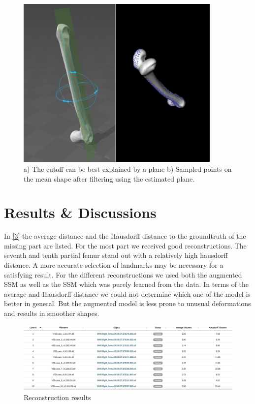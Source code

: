 \documentclass{article}
\begin{document}
	\begin{figure}
	\centering
	\includegraphics[width=10cm]{4.png}
	 \caption{ a) The cutoff can be best explained by a plane b) Sampled points on the mean shape after filtering using the estimated plane.}
	 \label{2}
	\end{figure}
	
	



	
	\section{Results \& Discussions}
	
	In \autoref{3} the average distance and the Hausdorff distance to the groundtruth of the missing part are listed. For the most part we received good reconstructions. The seventh and tenth partial femur stand out with a relatively high hausdorff distance. A more accurate selection of landmarks may be necessary for a satisfying result. 
	For the different reconstructions we used both the augmented SSM as well as the SSM which was purely learned from the data. In terms of the average and Hausdorff distance we could not determine which one of the model is better in general. But the augmented model is less prone to unusual deformations and results in smoother shapes.
	\begin{figure}
		\centering
		\includegraphics[width=15cm]{3.png}
		\caption{Reconstruction results}
		\label{3}
	\end{figure}
\end{document}
